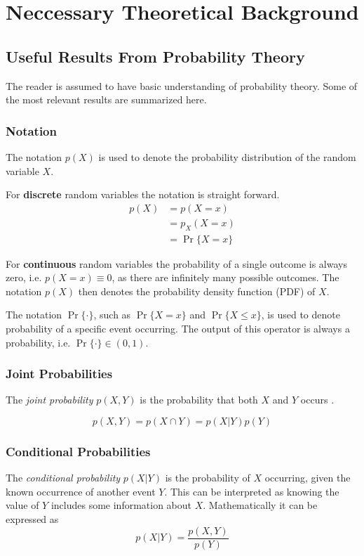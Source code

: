 \chapter{Neccessary Theoretical Background}\label{chap:theory}

\section{Useful Results From Probability Theory}

The reader is assumed to have basic understanding of probability theory. Some of the most relevant results are summarized here.
 
 \subsection{Notation}
 
 The notation $p(X)$ is used to denote the probability distribution of the random variable $X$.
 
 For \textbf{discrete} random variables the notation is straight forward. 
 \begin{align*}
 p(X) &= p(X=x)\\  &= p_X(X=x)\\ &= \Pr\{X = x\}
 \end{align*}
 
 For \textbf{continuous} random variables the probability of a single outcome is always zero, i.e. $p(X = x) \equiv 0$, as there are infinitely many possible outcomes. The notation $p(X)$ then denotes the probability density function (PDF) of $X$. 
 
 The notation $\Pr\{\cdot\}$, such as $\Pr\{X=x\}$ and $\Pr\{X \leq x\}$, is used to denote probability of a specific event occurring. The output of this operator is always a probability, i.e. $\Pr\{\cdot\} \in (0, 1)$. 
 
 
 
\subsection{Joint Probabilities}
The \textit{joint probability} $p(X, Y)$ is the probability that both $X$ and $Y$ occurs \cite[p.~29]{murphy}.

\begin{equation}
    p(X, Y) = p(X \cap Y) = p(X | Y)p(Y)
\end{equation}

\subsection{Conditional Probabilities}
The \textit{conditional probability} $p(X | Y)$ is the probability of $X$ occurring, given the known occurrence of another event $Y$. This can be interpreted as knowing the value of $Y$ includes some information about $X$. Mathematically it can be expressed as \cite[p.~29]{murphy}
\begin{equation}\label{eq:conditional_probability}
    p(X | Y) = \frac{p(X, Y)}{p(Y)}
\end{equation}

